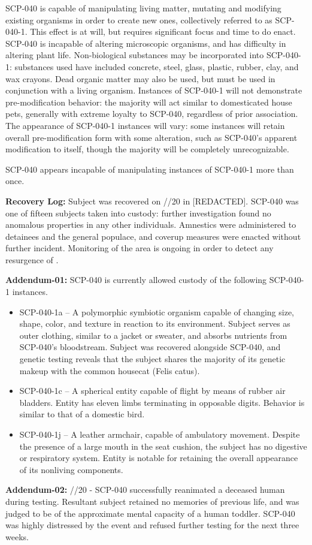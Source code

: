 SCP-040 is capable of manipulating living matter, mutating and modifying existing organisms in order to create new ones, collectively referred to as SCP-040-1. This effect is at will, but requires significant focus and time to do enact. SCP-040 is incapable of altering microscopic organisms, and has difficulty in altering plant life. Non-biological substances may be incorporated into SCP-040-1: substances used have included concrete, steel, glass, plastic, rubber, clay, and wax crayons. Dead organic matter may also be used, but must be used in conjunction with a living organism. Instances of SCP-040-1 will not demonstrate pre-modification behavior: the majority will act similar to domesticated house pets, generally with extreme loyalty to SCP-040, regardless of prior association. The appearance of SCP-040-1 instances will vary: some instances will retain overall pre-modification form with some alteration, such as SCP-040’s apparent modification to itself, though the majority will be completely unrecognizable.

SCP-040 appears incapable of manipulating instances of SCP-040-1 more than once.

\textbf{Recovery Log:} Subject was recovered on //20 in [REDACTED]. SCP-040 was one of fifteen subjects taken into custody: further investigation found no anomalous properties in any other individuals. Amnestics were administered to detainees and the general populace, and coverup measures were enacted without further incident. Monitoring of the area is ongoing in order to detect any resurgence of  .

\textbf{Addendum-01:} SCP-040 is currently allowed custody of the following SCP-040-1 instances.
\begin{itemize}
\item SCP-040-1a – A polymorphic symbiotic organism capable of changing size, shape, color, and texture in reaction to its environment. Subject serves as outer clothing, similar to a jacket or sweater, and absorbs nutrients from SCP-040’s bloodstream. Subject was recovered alongside SCP-040, and genetic testing reveals that the subject shares the majority of its genetic makeup with the common housecat (Felis catus).
\item SCP-040-1c – A spherical entity capable of flight by means of rubber air bladders. Entity has eleven limbs terminating in opposable digits. Behavior is similar to that of a domestic bird.
\item SCP-040-1j – A leather armchair, capable of ambulatory movement. Despite the presence of a large mouth in the seat cushion, the subject has no digestive or respiratory system. Entity is notable for retaining the overall appearance of its nonliving components.
\end{itemize}

\textbf{Addendum-02:} //20 - SCP-040 successfully reanimated a deceased human during testing. Resultant subject retained no memories of previous life, and was judged to be of the approximate mental capacity of a human toddler. SCP-040 was highly distressed by the event and refused further testing for the next three weeks.